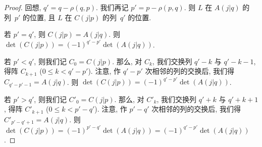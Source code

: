 \documentclass[../libro.tex]{subfiles}
\begin{document}
\begin{proof}
    回想, \(q' = q - \rho(q, p)\).
    我们再记 \(p' = p - \rho(p, q)\).
    则 \(L\) 在 \(A(j|q)\) 的列~\(p'\) 的位置,
    且 \(L\) 在 \(C(j|p)\) 的列~\(q'\) 的位置.

    若 \(p' = q'\), 则 \(C(j|p) = A(j|q)\).
    则 \(\det {(C(j|p))} = (-1)^{q'-p'} \det {(A(j|q))}\).

    若 \(p' < q'\), 则我们记 \(C_0 = C(j|p)\).
    那么, 对 \(C_k\),
    我们交换列 \(q' - k\) 与 \(q' - k - 1\),
    得阵 \(C_{k+1}\)
    (\(0 \leq k < q' - p'\)).
    注意, 作 \(q' - p'\) 次相邻的列的交换后,
    我们得 \(C_{q'-p'-1} = A(j|q)\).
    则 \(\det {(C(j|p))} = (-1)^{q' - p'} \det {(A(j|q))}\).

    若 \(p' > q'\), 则我们记 \(C'_0 = C(j|p)\).
    那么, 对 \(C'_k\),
    我们交换列 \(q' + k\) 与 \(q' + k + 1\),
    得阵 \(C'_{k+1}\)
    (\(0 \leq k < p' - q'\)).
    注意, 作 \(p' - q'\) 次相邻的列的交换后,
    我们得 \(C'_{p'-q'+1} = A(j|q)\).
    则 \(\det {(C(j|p))}
        = (-1)^{p' - q'} \det {(A(j|q))}
    = (-1)^{q' - p'} \det {(A(j|q))}\).


\end{proof}
\end{document}
